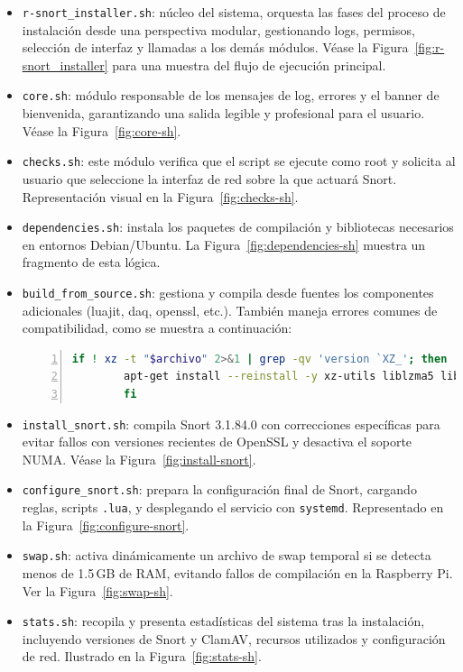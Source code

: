 \documentclass[12pt,a4paper]{report}
\begin{document}
\begin{itemize}
	\item \texttt{r-snort\_installer.sh}: núcleo del sistema, orquesta las fases del proceso de instalación desde una perspectiva modular, gestionando logs, permisos, selección de interfaz y llamadas a los demás módulos.  
	Véase la Figura~\ref{fig:r-snort_installer} para una muestra del flujo de ejecución principal.
	
	\item \texttt{core.sh}: módulo responsable de los mensajes de log, errores y el banner de bienvenida, garantizando una salida legible y profesional para el usuario.  
	Véase la Figura~\ref{fig:core-sh}.
	
	\item \texttt{checks.sh}: este módulo verifica que el script se ejecute como root y solicita al usuario que seleccione la interfaz de red sobre la que actuará Snort.  
	Representación visual en la Figura~\ref{fig:checks-sh}.
	
	\item \texttt{dependencies.sh}: instala los paquetes de compilación y bibliotecas necesarios en entornos Debian/Ubuntu.  
	La Figura~\ref{fig:dependencies-sh} muestra un fragmento de esta lógica.
	
	\item \texttt{build\_from\_source.sh}: gestiona y compila desde fuentes los componentes adicionales (luajit, daq, openssl, etc.).  
	También maneja errores comunes de compatibilidad, como se muestra a continuación:
	
	\begin{lstlisting}[language=bash, caption={Corrección de versiones incompatibles de xz/liblzma}, label=lst:xz, basicstyle=\ttfamily\footnotesize, frame=single, numbers=left, numberstyle=\tiny, breaklines=true]
		if ! xz -t "$archivo" 2>&1 | grep -qv 'version `XZ_'; then
		apt-get install --reinstall -y xz-utils liblzma5 liblzma-dev
		fi
	\end{lstlisting}
	
	\item \texttt{install\_snort.sh}: compila Snort 3.1.84.0 con correcciones específicas para evitar fallos con versiones recientes de OpenSSL y desactiva el soporte NUMA.  
	Véase la Figura~\ref{fig:install-snort}.
	
	\item \texttt{configure\_snort.sh}: prepara la configuración final de Snort, cargando reglas, scripts \texttt{.lua}, y desplegando el servicio con \texttt{systemd}.  
	Representado en la Figura~\ref{fig:configure-snort}.
	
	\item \texttt{swap.sh}: activa dinámicamente un archivo de swap temporal si se detecta menos de 1.5\,GB de RAM, evitando fallos de compilación en la Raspberry Pi.  
	Ver la Figura~\ref{fig:swap-sh}.
	
	\item \texttt{stats.sh}: recopila y presenta estadísticas del sistema tras la instalación, incluyendo versiones de Snort y ClamAV, recursos utilizados y configuración de red.  
	Ilustrado en la Figura~\ref{fig:stats-sh}.
\end{itemize}
\end{document}

